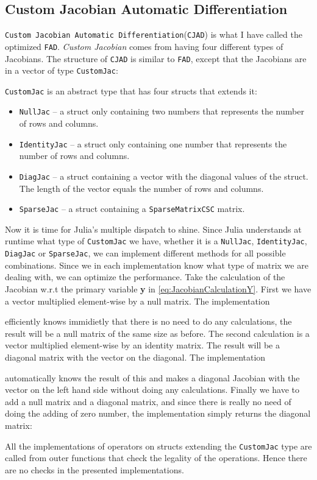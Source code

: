 \subsection{Custom Jacobian Automatic Differentiation}
\texttt{Custom Jacobian Automatic Differentiation}(\texttt{CJAD}) is what I have called the optimized \texttt{FAD}. \textit{Custom Jacobian} comes from having four different types of Jacobians. The structure of \texttt{CJAD} is similar to \texttt{FAD}, except that the Jacobians are in a vector of type \texttt{CustomJac}:

\texttt{CustomJac} is an abstract type that has four structs that extends it:
\begin{itemize}
    \item \texttt{NullJac} -- a struct only containing two numbers that represents the number of rows and columns.
    \item \texttt{IdentityJac} -- a struct only containing one number that represents the number of rows and columns.
    \item \texttt{DiagJac} -- a struct containing a vector with the diagonal values of the struct. The length of the vector equals the number of rows and columns.
    \item \texttt{SparseJac} -- a struct containing a \texttt{SparseMatrixCSC} matrix.
\end{itemize}
Now it is time for Julia's multiple dispatch to shine. Since Julia understands at runtime what type of \texttt{CustomJac} we have, whether it is a \texttt{NullJac}, \texttt{IdentityJac}, \texttt{DiagJac} or \texttt{SparseJac}, we can implement different methods for all possible combinations. Since we in each implementation know what type of matrix we are dealing with, we can optimize the performance. Take the calculation of the Jacobian w.r.t the primary variable \textbf{y} in \eqref{eq:JacobianCalculationY}. First we have a vector multiplied element-wise by a null matrix. The implementation

efficiently knows immidietly that there is no need to do any calculations, the result will be a null matrix of the same size as before. The second calculation is a vector multiplied element-wise by an identity matrix. The result will be a diagonal matrix with the vector on the diagonal. The implementation 

automatically knows the result of this and makes a diagonal Jacobian with the vector on the left hand side without doing any calculations. Finally we have to add a null matrix and a diagonal matrix, and since there is really no need of doing the adding of zero number, the implementation simply returns the diagonal matrix:

All the implementations of operators on structs extending the \texttt{CustomJac} type are called from outer functions that check the legality of the operations. Hence there are no checks in the presented implementations.


